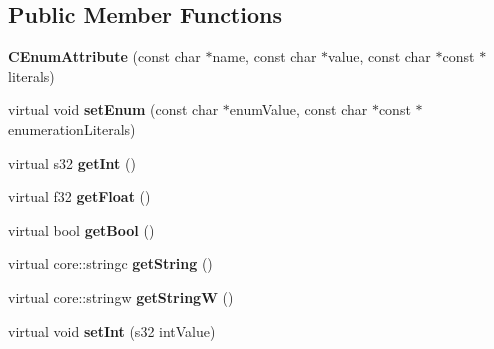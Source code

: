 \subsection*{Public Member Functions}
\begin{DoxyCompactItemize}
\item 
\hypertarget{classirr_1_1io_1_1_c_enum_attribute_a2da196a3af56ce246eb5078de939ac28}{{\bfseries C\-Enum\-Attribute} (const char $\ast$name, const char $\ast$value, const char $\ast$const $\ast$literals)}\label{classirr_1_1io_1_1_c_enum_attribute_a2da196a3af56ce246eb5078de939ac28}

\item 
\hypertarget{classirr_1_1io_1_1_c_enum_attribute_a0833803fa26d2372869c4c9a379e471b}{virtual void {\bfseries set\-Enum} (const char $\ast$enum\-Value, const char $\ast$const $\ast$enumeration\-Literals)}\label{classirr_1_1io_1_1_c_enum_attribute_a0833803fa26d2372869c4c9a379e471b}

\item 
\hypertarget{classirr_1_1io_1_1_c_enum_attribute_a6bbf5d2098a171c34636fe2748d577b0}{virtual s32 {\bfseries get\-Int} ()}\label{classirr_1_1io_1_1_c_enum_attribute_a6bbf5d2098a171c34636fe2748d577b0}

\item 
\hypertarget{classirr_1_1io_1_1_c_enum_attribute_a4606ef6af513b745df90529c4e577b12}{virtual f32 {\bfseries get\-Float} ()}\label{classirr_1_1io_1_1_c_enum_attribute_a4606ef6af513b745df90529c4e577b12}

\item 
\hypertarget{classirr_1_1io_1_1_c_enum_attribute_a3d3e0cd306e77bc79deba2bdd3b6b547}{virtual bool {\bfseries get\-Bool} ()}\label{classirr_1_1io_1_1_c_enum_attribute_a3d3e0cd306e77bc79deba2bdd3b6b547}

\item 
\hypertarget{classirr_1_1io_1_1_c_enum_attribute_a55e910a303327513d673f1f9287470eb}{virtual core\-::stringc {\bfseries get\-String} ()}\label{classirr_1_1io_1_1_c_enum_attribute_a55e910a303327513d673f1f9287470eb}

\item 
\hypertarget{classirr_1_1io_1_1_c_enum_attribute_a9ebd8ef077aa498d6c768a8417fcf7ee}{virtual core\-::stringw {\bfseries get\-String\-W} ()}\label{classirr_1_1io_1_1_c_enum_attribute_a9ebd8ef077aa498d6c768a8417fcf7ee}

\item 
\hypertarget{classirr_1_1io_1_1_c_enum_attribute_aaff7d360f03171948f9c71d1f9de3c7e}{virtual void {\bfseries set\-Int} (s32 int\-Value)}\label{classirr_1_1io_1_1_c_enum_attribute_aaff7d360f03171948f9c71d1f9de3c7e}


\end{DoxyCompactItemize}
